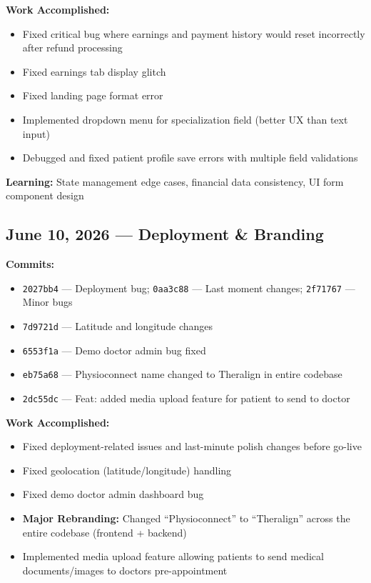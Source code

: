 \documentclass[11pt,a4paper]{article}
\begin{document}
\textbf{Work Accomplished:}
\begin{itemize}
  \item Fixed critical bug where earnings and payment history would reset incorrectly
        after refund processing
  \item Fixed earnings tab display glitch
  \item Fixed landing page format error
  \item Implemented dropdown menu for specialization field (better UX than text input)
  \item Debugged and fixed patient profile save errors with multiple field validations
\end{itemize}

\textbf{Learning:} State management edge cases, financial data consistency,
UI form component design

\subsection{June 10, 2026 — Deployment \& Branding}

\textbf{Commits:}
\begin{itemize}
  \item \texttt{2027bb4} — Deployment bug; \texttt{0aa3c88} — Last moment changes;
        \texttt{2f71767} — Minor bugs
  \item \texttt{7d9721d} — Latitude and longitude changes
  \item \texttt{6553f1a} — Demo doctor admin bug fixed
  \item \texttt{eb75a68} — Physioconnect name changed to Theralign in entire codebase
  \item \texttt{2dc55dc} — Feat: added media upload feature for patient to send to doctor
\end{itemize}

\textbf{Work Accomplished:}
\begin{itemize}
  \item Fixed deployment-related issues and last-minute polish changes before go-live
  \item Fixed geolocation (latitude/longitude) handling
  \item Fixed demo doctor admin dashboard bug
  \item \textbf{Major Rebranding:} Changed ``Physioconnect'' to ``Theralign'' across the entire
        codebase (frontend + backend)
  \item Implemented media upload feature allowing patients to send medical documents/images
        to doctors pre-appointment
\end{itemize}
\end{document}
